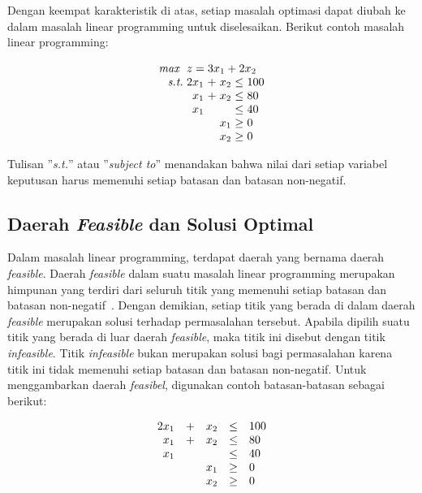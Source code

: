 Dengan keempat karakteristik di atas, setiap masalah optimasi dapat diubah ke dalam masalah linear programming untuk diselesaikan. Berikut contoh masalah linear programming:

\begin{equation*}
	\setlength\arraycolsep{1.5pt}
	\begin{array}{r r c r c l}
		\textit{max } &\multicolumn{5}{l}{z = 3x_1 + 2x_2}\\
		\textit{s.t.} &2x_1 &+ &x_2 &\leq &100\\
		&x_1 &+ &x_2 &\leq &80\\
		&x_1 &&&\leq &40\\
		&&&x_1 &\geq &0\\
		&&&x_2 &\geq &0\\
	\end{array}
\end{equation*}

	Tulisan ''\textit{s.t.}'' atau ''\textit{subject to}'' menandakan bahwa nilai dari setiap variabel keputusan harus memenuhi setiap batasan dan batasan non-negatif.

\subsection{Daerah \textit{Feasible} dan Solusi Optimal}
Dalam masalah linear programming, terdapat daerah yang bernama daerah \textit{feasible}. Daerah \textit{feasible} dalam suatu masalah linear programming merupakan himpunan yang terdiri dari seluruh titik yang memenuhi setiap batasan dan batasan non-negatif~\cite{winston2004operations}. Dengan demikian, setiap titik yang berada di dalam daerah \textit{feasible} merupakan solusi terhadap permasalahan tersebut. Apabila dipilih suatu titik yang berada di luar daerah \textit{feasible}, maka titik ini disebut dengan titik \textit{infeasible}. Titik \textit{infeasible} bukan merupakan solusi bagi permasalahan karena titik ini tidak memenuhi setiap batasan dan batasan non-negatif. Untuk menggambarkan daerah \textit{feasibel}, digunakan contoh batasan-batasan sebagai berikut:

\begin{equation*}
	\begin{array}{r c r c l}		
		2x_1 &+ &x_2 &\leq &100\\
		x_1 &+ &x_2 &\leq &80\\
		x_1 &&&\leq &40\\
		&&x_1 &\geq &0\\
		&&x_2 &\geq &0\\
	\end{array}
\end{equation*}

